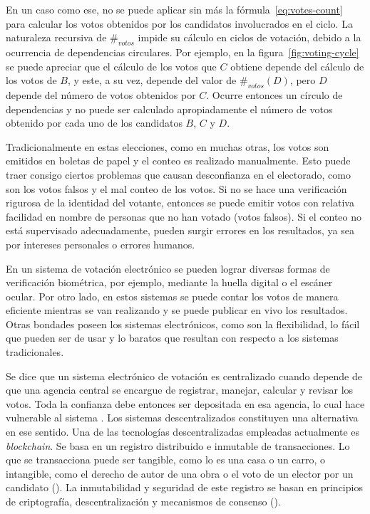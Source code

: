 En un  caso como ese, no se puede aplicar sin m\'as la f\'ormula~\eqref{eq:votes-count} para calcular los votos obtenidos por los candidatos involucrados en el ciclo.  La naturaleza recursiva de $\#_{votos}$ impide su c\'alculo en ciclos de votaci\'on, debido a la ocurrencia de dependencias circulares. Por ejemplo, en la figura~\ref{fig:voting-cycle} se puede apreciar que el c\'alculo de los votos que $C$ obtiene depende del c\'alculo de los votos de $B$, y este, a su vez, depende del valor de $\#_{votos}(D)$, pero $D$ depende del n\'umero de votos obtenidos por $C$. Ocurre entonces un c\'irculo de dependencias y no puede ser calculado apropiadamente el n\'umero de votos obtenido por cada uno de los candidatos $B$, $C$ y $D$.



Tradicionalmente en estas elecciones, como en muchas otras, los votos son emitidos en boletas de papel y el conteo es realizado manualmente. Esto puede traer consigo ciertos problemas que causan desconfianza en el electorado, como son los votos falsos y el mal conteo de los votos.   Si no se hace una verificaci\'on rigurosa de la identidad del votante, entonces se puede emitir votos con relativa facilidad en nombre de personas que no han votado (votos falsos). Si el conteo no est\'a supervisado adecuadamente, pueden surgir errores en los resultados, ya sea por intereses personales o errores humanos.

En un sistema de votaci\'on electr\'onico se  pueden lograr diversas formas de verificaci\'on biom\'etrica, por ejemplo, mediante la huella digital o el esc\'aner ocular.  Por otro lado, en estos sistemas se puede contar los votos de manera eficiente mientras se van realizando y se  puede publicar en vivo los resultados.  Otras bondades poseen los sistemas electrónicos, como son la flexibilidad, lo fácil que pueden ser de usar y lo baratos que resultan con respecto a los sistemas tradicionales. 

Se dice que un sistema electrónico de votaci\'on es centralizado cuando depende de que una agencia central se encargue de registrar, manejar, calcular y revisar los votos. Toda la confianza debe entonces ser depositada en esa agencia, lo cual hace vulnerable al sistema \citep{chica2018weaknesses}. Los sistemas descentralizados constituyen una alternativa en ese sentido. Una de las tecnologías descentralizadas empleadas actualmente es \textit{blockchain}.   Se basa en un registro distribuido e inmutable  de transacciones. Lo que se transacciona puede ser tangible, como lo es  una casa o un carro,  o intangible, como el derecho de autor de una obra o el voto de un elector por un candidato (\cite{blockchain-ibm}). La inmutabilidad y seguridad de este registro se basan en principios de  criptografía, descentralizaci\'on y mecanismos de consenso (\cite{blockch-security-ibm}). 


